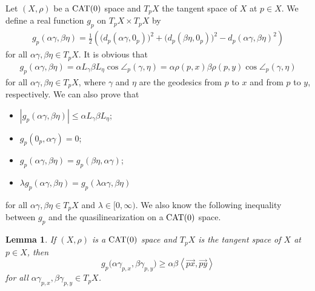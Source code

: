\documentclass[draft]{amsart}
\numberwithin{equation}{section}
\newcommand{\ip}[2]{\left\langle #1, #2 \right\rangle}
\providecommand{\abs}[1]{\left\lvert#1\right\rvert}
\newcommand{\CAT}{\textup{CAT}}
\theoremstyle{plain}
\newtheorem{lemma}[theorem]{Lemma}
\theoremstyle{definition}
\theoremstyle{remark}
\begin{document}
Let $(X,\rho)$ be a $\CAT(0)$ space and 
$T_pX$ the tangent space of $X$ at $p\in X$. 
We define a real function $g_p$ on $T_pX\times T_pX$ by 
\begin{align}\label{eq:def-g_p}
 g_p(\alpha \gamma, \beta \eta) 
 = \frac{1}{2}\left(
 \bigl(d_p(\alpha \gamma, 0_p)\bigr)^2 
 + \bigl(d_p(\beta \eta, 0_p)\bigr)^2 
 - d_p(\alpha \gamma, \beta \eta)^2
 \right) 
\end{align}
for all $\alpha \gamma, \beta \eta \in T_pX$. 
It is obvious that 
\begin{align}\label{eq:equality-g_p}
 g_p(\alpha \gamma, \beta \eta) 
= \alpha L_{\gamma} \beta L_{\eta} \cos \angle_p(\gamma, \eta) 
= \alpha \rho(p, x) \beta \rho(p, y) \cos \angle_p(\gamma, \eta) 
\end{align}
for all $\alpha \gamma, \beta \eta \in T_pX$, 
where $\gamma$ and $\eta$ are the geodesics 
from $p$ to $x$ and from $p$ to $y$, respectively. 
We can also prove that 
\begin{itemize}
 \item $\abs{g_p(\alpha \gamma, \beta \eta)} \leq \alpha L_{\gamma} \beta L_{\eta}$; 
 \item $g_p(0_p, \alpha \gamma)=0$; 
 \item $g_p(\alpha \gamma, \beta \eta) 
 = g_p(\beta \eta, \alpha \gamma)$; 
 \item $\lambda g_p(\alpha \gamma, \beta \eta) 
 = g_p(\lambda \alpha \gamma, \beta \eta)$
\end{itemize}
for all $\alpha \gamma, \beta \eta\in T_pX$ and $\lambda \in [0,\infty)$. 
We also know the following inequality between $g_p$ 
and the quasilinearization on a $\CAT(0)$ space. 
\begin{lemma}\label{lem:g_p-ql}
 If $(X, \rho)$ is a $\CAT(0)$ space and $T_pX$ 
 is the tangent space of $X$ at $p\in X$, then 
 \[
  g_p\bigl(\alpha \gamma_{p, x}, \beta \gamma_{p, y}\bigr) 
  \geq \alpha \beta \ip{\overrightarrow{px}}{\overrightarrow{py}}
 \]
 for all $\alpha \gamma_{p, x}, \beta \gamma_{p, y} \in T_pX$. 
\end{lemma}
\end{document}
